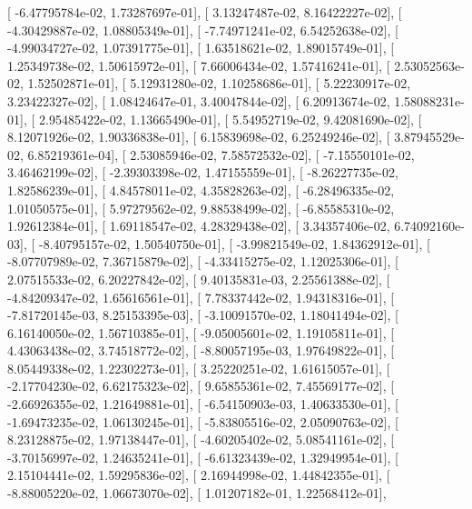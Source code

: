 \documentclass{article}
\begin{document}
       [ -6.47795784e-02,   1.73287697e-01],
       [  3.13247487e-02,   8.16422227e-02],
       [ -4.30429887e-02,   1.08805349e-01],
       [ -7.74971241e-02,   6.54252638e-02],
       [ -4.99034727e-02,   1.07391775e-01],
       [  1.63518621e-02,   1.89015749e-01],
       [  1.25349738e-02,   1.50615972e-01],
       [  7.66006434e-02,   1.57416241e-01],
       [  2.53052563e-02,   1.52502871e-01],
       [  5.12931280e-02,   1.10258686e-01],
       [  5.22230917e-02,   3.23422327e-02],
       [  1.08424647e-01,   3.40047844e-02],
       [  6.20913674e-02,   1.58088231e-01],
       [  2.95485422e-02,   1.13665490e-01],
       [  5.54952719e-02,   9.42081690e-02],
       [  8.12071926e-02,   1.90336838e-01],
       [  6.15839698e-02,   6.25249246e-02],
       [  3.87945529e-02,   6.85219361e-04],
       [  2.53085946e-02,   7.58572532e-02],
       [ -7.15550101e-02,   3.46462199e-02],
       [ -2.39303398e-02,   1.47155559e-01],
       [ -8.26227735e-02,   1.82586239e-01],
       [  4.84578011e-02,   4.35828263e-02],
       [ -6.28496335e-02,   1.01050575e-01],
       [  5.97279562e-02,   9.88538499e-02],
       [ -6.85585310e-02,   1.92612384e-01],
       [  1.69118547e-02,   4.28329438e-02],
       [  3.34357406e-02,   6.74092160e-03],
       [ -8.40795157e-02,   1.50540750e-01],
       [ -3.99821549e-02,   1.84362912e-01],
       [ -8.07707989e-02,   7.36715879e-02],
       [ -4.33415275e-02,   1.12025306e-01],
       [  2.07515533e-02,   6.20227842e-02],
       [  9.40135831e-03,   2.25561388e-02],
       [ -4.84209347e-02,   1.65616561e-01],
       [  7.78337442e-02,   1.94318316e-01],
       [ -7.81720145e-03,   8.25153395e-03],
       [ -3.10091570e-02,   1.18041494e-02],
       [  6.16140050e-02,   1.56710385e-01],
       [ -9.05005601e-02,   1.19105811e-01],
       [  4.43063438e-02,   3.74518772e-02],
       [ -8.80057195e-03,   1.97649822e-01],
       [  8.05449338e-02,   1.22302273e-01],
       [  3.25220251e-02,   1.61615057e-01],
       [ -2.17704230e-02,   6.62175323e-02],
       [  9.65855361e-02,   7.45569177e-02],
       [ -2.66926355e-02,   1.21649881e-01],
       [ -6.54150903e-03,   1.40633530e-01],
       [ -1.69473235e-02,   1.06130245e-01],
       [ -5.83805516e-02,   2.05090763e-02],
       [  8.23128875e-02,   1.97138447e-01],
       [ -4.60205402e-02,   5.08541161e-02],
       [ -3.70156997e-02,   1.24635241e-01],
       [ -6.61323439e-02,   1.32949954e-01],
       [  2.15104441e-02,   1.59295836e-02],
       [  2.16944998e-02,   1.44842355e-01],
       [ -8.88005220e-02,   1.06673070e-02],
       [  1.01207182e-01,   1.22568412e-01],
\end{document}
